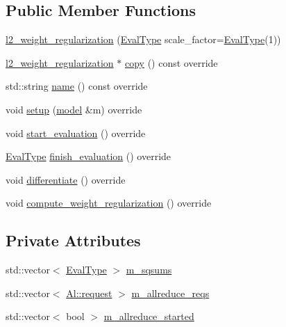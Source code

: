 \subsection*{Public Member Functions}
\begin{DoxyCompactItemize}
\item 
\hyperlink{classlbann_1_1l2__weight__regularization_aa2a01507574b4d349ae8bb9bb784ecaf}{l2\+\_\+weight\+\_\+regularization} (\hyperlink{base_8hpp_a3266f5ac18504bbadea983c109566867}{Eval\+Type} scale\+\_\+factor=\hyperlink{base_8hpp_a3266f5ac18504bbadea983c109566867}{Eval\+Type}(1))
\item 
\hyperlink{classlbann_1_1l2__weight__regularization}{l2\+\_\+weight\+\_\+regularization} $\ast$ \hyperlink{classlbann_1_1l2__weight__regularization_ac00a969efe6c3fd911a0d69428bb5b95}{copy} () const override
\item 
std\+::string \hyperlink{classlbann_1_1l2__weight__regularization_acf602d51617f6730343948b72ace8dfe}{name} () const override
\item 
void \hyperlink{classlbann_1_1l2__weight__regularization_a0320afab573fbe77b5ba6d22ea5e0898}{setup} (\hyperlink{classlbann_1_1model}{model} \&m) override
\item 
void \hyperlink{classlbann_1_1l2__weight__regularization_ab3a47d8ef5b8c8e16f076659e864f683}{start\+\_\+evaluation} () override
\item 
\hyperlink{base_8hpp_a3266f5ac18504bbadea983c109566867}{Eval\+Type} \hyperlink{classlbann_1_1l2__weight__regularization_a5517e1fa9da8a28f39cf208054f6138a}{finish\+\_\+evaluation} () override
\item 
void \hyperlink{classlbann_1_1l2__weight__regularization_a64f5cd1a4a30727a81f112e51367700e}{differentiate} () override
\item 
void \hyperlink{classlbann_1_1l2__weight__regularization_a1dce8a486660335097f5ad239b343e39}{compute\+\_\+weight\+\_\+regularization} () override
\end{DoxyCompactItemize}
\subsection*{Private Attributes}
\begin{DoxyCompactItemize}
\item 
std\+::vector$<$ \hyperlink{base_8hpp_a3266f5ac18504bbadea983c109566867}{Eval\+Type} $>$ \hyperlink{classlbann_1_1l2__weight__regularization_a628aabb4e824f2aa861baba93668dc24}{m\+\_\+sqsums}
\item 
std\+::vector$<$ \hyperlink{structlbann_1_1Al_1_1request}{Al\+::request} $>$ \hyperlink{classlbann_1_1l2__weight__regularization_adf7350e151736d9bae4aa5cf410acd80}{m\+\_\+allreduce\+\_\+reqs}
\item 
std\+::vector$<$ bool $>$ \hyperlink{classlbann_1_1l2__weight__regularization_a0ae4858adb3279c0019f5e0500bdcf4f}{m\+\_\+allreduce\+\_\+started}
\end{DoxyCompactItemize}
